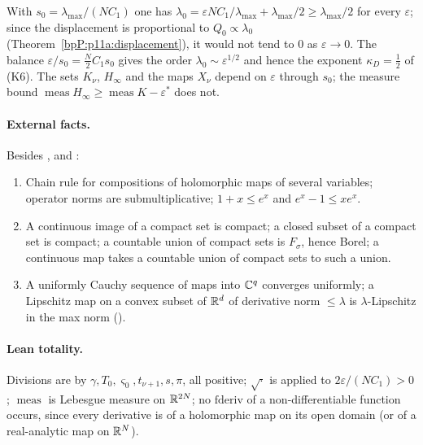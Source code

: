 \begin{remark}\label{bpP:p11a:why-free}
With $s_0=\lambda_{\max}/(NC_1)$ one has $\lambda_0=\varepsilon NC_1/\lambda_{\max}+\lambda_{\max}/2\ge\lambda_{\max}/2$ for every $\varepsilon$; since the displacement is proportional to $Q_0\propto\lambda_0$ (Theorem~\ref{bpP:p11a:displacement}), it would not tend to $0$ as $\varepsilon\to0$. The balance $\varepsilon/s_0=\frac N2C_1s_0$ gives the order $\lambda_0\sim\varepsilon^{1/2}$ and hence the exponent $\kappa_D=\frac12$ of (K6). The sets $K_\nu$, $H_\infty$ and the maps $X_\nu$ depend on $\varepsilon$ through $s_0$; the measure bound $\operatorname{meas}H_\infty\ge\operatorname{meas}K-\varepsilon^*$ does not.
\end{remark}

\paragraph{External facts.} Besides ,  and :
\begin{enumerate}[label=(Z\arabic*),ref=(Z\arabic*)]
\item\label{bpP:p11a:z-chain} Chain rule for compositions of holomorphic maps of several variables; operator norms are submultiplicative; $1+x\le e^x$ and $e^x-1\le xe^x$.
\item\label{bpP:p11a:z-compact} A continuous image of a compact set is compact; a closed subset of a compact set is compact; a countable union of compact sets is $F_\sigma$, hence Borel; a continuous map takes a countable union of compact sets to such a union.
\item\label{bpP:p11a:z-uniform} A uniformly Cauchy sequence of maps into $\mathbb{C}^q$ converges uniformly; a Lipschitz map on a convex subset of $\mathbb{R}^d$ of derivative norm $\le\lambda$ is $\lambda$-Lipschitz in the max norm ().
\end{enumerate}

\paragraph{Lean totality.} Divisions are by $\gamma,T_0,\varsigma_0,t_{\nu+1},s,\pi$, all positive; $\sqrt{\cdot}$ is applied to $2\varepsilon/(NC_1)>0$; $\operatorname{meas}$ is Lebesgue measure on $\mathbb{R}^{2N}$; no $\mathrm{fderiv}$ of a non-differentiable function occurs, since every derivative is of a holomorphic map on its open domain (or of a real-analytic map on $\mathbb{R}^N$).


